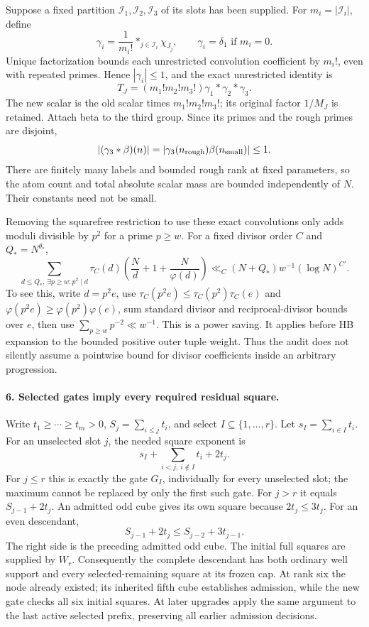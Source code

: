 Suppose a fixed partition $\mathcal I_1,\mathcal I_2,\mathcal I_3$
of its slots has been supplied. For $m_i=|\mathcal I_i|$, define
\[
 \gamma_i=\frac1{m_i!}\mathop{*}_{j\in\mathcal I_i}\chi_{J_j},
 \qquad \gamma_i=\delta_1\text{ if }m_i=0.
\]
Unique factorization bounds each unrestricted convolution coefficient
by $m_i!$, even with repeated primes. Hence $|\gamma_i|\le1$, and
the exact unrestricted identity is
\[
 T_J=(m_1!m_2!m_3!)\gamma_1*\gamma_2*\gamma_3.
\]
The new scalar is the old scalar times $m_1!m_2!m_3!$; its original
factor $1/M_J$ is retained. Attach beta to the third group. Since its
primes and the rough primes are disjoint,
\[
 |(\gamma_3*\beta)(n)|
 =|\gamma_3(n_{\rm rough})\beta(n_{\rm small})|\le1.
\]
There are finitely many labels and bounded rough rank at fixed
parameters, so the atom count and total absolute scalar mass are
bounded independently of $N$. Their constants need not be small.

Removing the squarefree restriction to use these exact convolutions
only adds moduli divisible by $p^2$ for a prime $p\ge w$. For a fixed
divisor order $C$ and $Q_*=N^{\theta_*}$,
\[
 \sum_{d\le Q_*,\ \exists p\ge w:p^2\mid d}
 \tau_C(d)\left(\frac Nd+1+\frac N{\varphi(d)}\right)
 \ll_C (N+Q_*)w^{-1}(\log N)^{C'}.
\]
To see this, write $d=p^2e$, use
$\tau_C(p^2e)\le\tau_C(p^2)\tau_C(e)$ and
$\varphi(p^2e)\ge\varphi(p^2)\varphi(e)$, sum standard divisor
and reciprocal-divisor bounds over $e$, then use
$\sum_{p\ge w}p^{-2}\ll w^{-1}$. This is a power saving.
It applies before HB expansion to the bounded positive outer tuple
weight. Thus the audit does not silently assume a pointwise bound
for divisor coefficients inside an arbitrary progression.

\paragraph{6. Selected gates imply every required residual square.}
Write $t_1\ge\cdots\ge t_m>0$, $S_j=\sum_{i\le j}t_i$, and
select $I\subseteq\{1,\ldots,r\}$. Let $s_I=\sum_{i\in I}t_i$.
For an unselected slot $j$, the needed square exponent is
\[
 s_I+\sum_{i<j,\ i\notin I}t_i+2t_j.
\]
For $j\le r$ this is exactly the gate $G_I$, individually for every
unselected slot; the maximum cannot be replaced by only the first
such gate. For $j>r$ it equals $S_{j-1}+2t_j$. An admitted odd cube
gives its own square because $2t_j\le3t_j$. For an even descendant,
\[
 S_{j-1}+2t_j\le S_{j-2}+3t_{j-1}.
\]
The right side is the preceding admitted odd cube. The initial full
squares are supplied by $W_r$. Consequently the complete descendant
has both ordinary well support and every selected-remaining square
at its frozen cap. At rank six the node already existed; its inherited
fifth cube establishes admission, while the new gate checks all six
initial squares. At later upgrades apply the same argument to the
last active selected prefix, preserving all earlier admission decisions.

